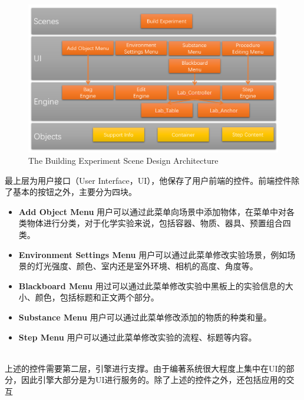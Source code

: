 \begin{figure}[!htp]
  \centering
  \includegraphics[width=12cm]{figure/buildearc.png}
    {The Building Experiment Scene Design Architecture}
 \label{fig:gm}
\end{figure}

最上层为用户接口（User Interface，UI），他保存了用户前端的控件。前端控件除了基本的按钮之外，主要分为四块。

\begin{itemize}
    \item \textbf{Add Object Menu}
用户可以通过此菜单向场景中添加物体，在菜单中对各类物体进行分类，对于化学实验来说，包括容器、物质、器具、预置组合四类。
    
    \item \textbf{Environment Settings Menu}
用户可以通过此菜单修改实验场景，例如场景的灯光强度、颜色、室内还是室外环境、相机的高度、角度等。
    
    \item \textbf{Blackboard Menu}
用过可以通过此菜单修改实验中黑板上的实验信息的大小、颜色，包括标题和正文两个部分。

    \item \textbf{Substance Menu}
用户可以通过此菜单修改添加的物质的种类和量。

    \item \textbf{Step Menu}
用户可以通过此菜单修改实验的流程、标题等内容。
\end{itemize}
~\\
\indent    	上述的控件需要第二层，引擎进行支撑。由于编著系统很大程度上集中在UI的部分，因此引擎大部分是为UI进行服务的。除了上述的控件之外，还包括应用的交互

